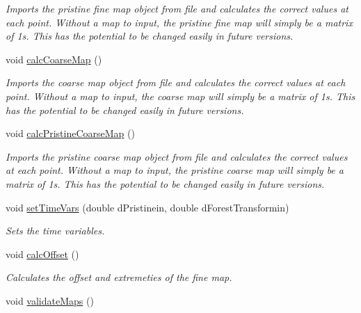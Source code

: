 \begin{DoxyCompactItemize}
\begin{DoxyCompactList}\small\item\em Imports the pristine fine map object from file and calculates the correct values at each point. Without a map to input, the pristine fine map will simply be a matrix of 1s. This has the potential to be changed easily in future versions. \end{DoxyCompactList}\item 
void \hyperlink{class_map_ac0b46ec7e4792d6ad3d7bdcf358ecabf}{calc\+Coarse\+Map} ()\hypertarget{class_map_ac0b46ec7e4792d6ad3d7bdcf358ecabf}{}\label{class_map_ac0b46ec7e4792d6ad3d7bdcf358ecabf}

\begin{DoxyCompactList}\small\item\em Imports the coarse map object from file and calculates the correct values at each point. Without a map to input, the coarse map will simply be a matrix of 1s. This has the potential to be changed easily in future versions. \end{DoxyCompactList}\item 
void \hyperlink{class_map_a4efc51f5d4e2bb562cf4126a7f291f33}{calc\+Pristine\+Coarse\+Map} ()\hypertarget{class_map_a4efc51f5d4e2bb562cf4126a7f291f33}{}\label{class_map_a4efc51f5d4e2bb562cf4126a7f291f33}

\begin{DoxyCompactList}\small\item\em Imports the pristine coarse map object from file and calculates the correct values at each point. Without a map to input, the pristine coarse map will simply be a matrix of 1s. This has the potential to be changed easily in future versions. \end{DoxyCompactList}\item 
void \hyperlink{class_map_aa91176218ae59941096b4a080b2e45ee}{set\+Time\+Vars} (double d\+Pristinein, double d\+Forest\+Transformin)
\begin{DoxyCompactList}\small\item\em Sets the time variables. \end{DoxyCompactList}\item 
void \hyperlink{class_map_a7615f4c20da51b3a96d60f9fa89ec73e}{calc\+Offset} ()
\begin{DoxyCompactList}\small\item\em Calculates the offset and extremeties of the fine map. \end{DoxyCompactList}\item 
void \hyperlink{class_map_a123d710095a549030f2c801ccf9645f1}{validate\+Maps} ()\hypertarget{class_map_a123d710095a549030f2c801ccf9645f1}{}\label{class_map_a123d710095a549030f2c801ccf9645f1}


\end{DoxyCompactItemize}
